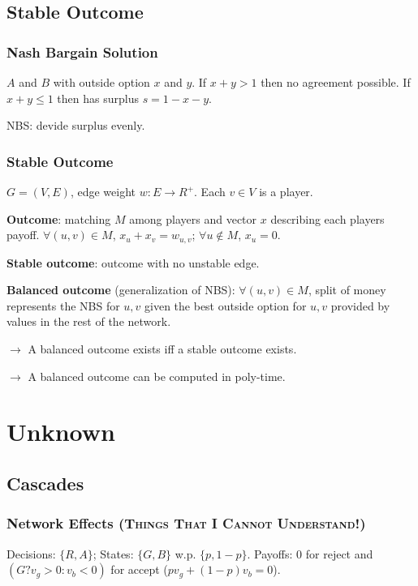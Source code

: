 \documentclass[a4paper,twocolumn,10pt]{article}
\begin{document}
\subsection{Stable Outcome}
	\subsubsection{Nash Bargain Solution}
		$A$ and $B$ with outside option $x$ and $y$.
		If $x+y>1$ then no agreement possible.
		If $x+y\le 1$ then has surplus $s=1-x-y$.

		NBS: devide surplus evenly.
	
	\subsubsection{Stable Outcome}
		$G=(V,E)$, edge weight $w:E\to R^+$. Each $v\in V$ is a player.
		
		\textbf{Outcome}: matching $M$ among players and vector $x$
			describing each players payoff.
			$\forall(u,v)\in M$, $x_u+x_v=w_{u,v}$; $\forall u\notin M$, $x_u=0$.
		
		\textbf{Stable outcome}: outcome with no unstable edge.

		\textbf{Balanced outcome} (generalization of NBS):
			$\forall (u,v)\in M$, split of money represents the NBS
				for $u,v$ given the best outside option for $u,v$
				provided by values in the rest of the network.

		$\to$ A balanced outcome exists iff a stable outcome exists.

		$\to$ A balanced outcome can be computed in poly-time.

\section{Unknown}

\subsection{Cascades}
	\subsubsection{Network Effects \textsc{(Things That I Cannot Understand!)}}
		Decisions: $\{R,A\}$;
		States: $\{G,B\}$ w.p. $\{p,1-p\}$.
		Payoffs: $0$ for reject and $(G ? v_g>0 : v_b<0)$ for accept
			($p v_g + (1-p) v_b = 0$).
\end{document}
